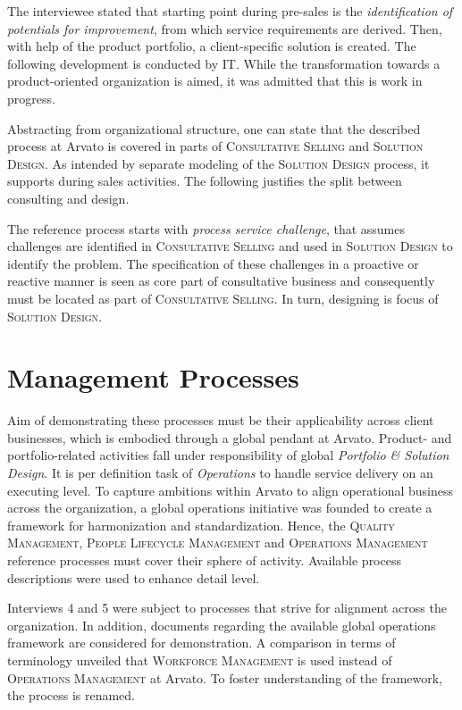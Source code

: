 	The interviewee stated that starting point during pre-sales is the \textit{identification of potentials for improvement}, from which service requirements are derived. Then, with help of the product portfolio, a client-specific solution is created. The following development is conducted by IT. While the transformation towards a product-oriented organization is aimed, it was admitted that this is work in progress. 
	
	Abstracting from organizational structure, one can state that the described process at Arvato is covered in parts of \textsc{Consultative Selling} and \textsc{Solution Design}. As intended by separate modeling of the \textsc{Solution Design} process, it supports during sales activities. The following justifies the split between consulting and design. 
	
	The reference process starts with \textit{process service challenge}, that assumes challenges are identified in \textsc{Consultative Selling} and used in \textsc{Solution Design} to identify the problem. The specification of these challenges in a proactive or reactive manner is seen as core part of consultative business and consequently must be located as part of \textsc{Consultative Selling}. In turn, designing is focus of \textsc{Solution Design}. 
	
	\section{Management Processes}
	Aim of demonstrating these processes must be their applicability across client businesses, which is embodied through a global pendant at Arvato. Product- and portfolio-related activities fall under responsibility of global \textit{Portfolio \& Solution Design}. It is per definition task of \textit{Operations} to handle service delivery on an executing level. To capture ambitions within Arvato to align operational business across the organization, a global operations initiative was founded to create a framework for harmonization and standardization. Hence, the \textsc{Quality Management}, \textsc{People Lifecycle Management} and \textsc{Operations Management} reference processes must cover their sphere of activity. Available process descriptions were used to enhance detail level. 
	
	Interviews 4 and 5 were subject to processes that strive for alignment across the organization. In addition, documents regarding the available global operations framework are considered for demonstration. A comparison in terms of terminology unveiled that \textsc{Workforce Management} is used instead of \textsc{Operations Management} at Arvato. To foster understanding of the framework, the process is renamed.
	
